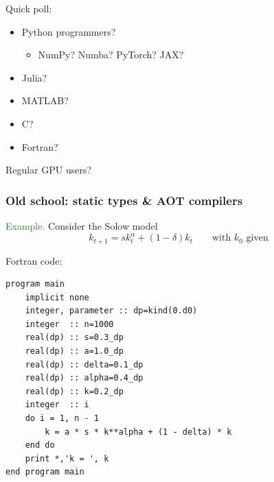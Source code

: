 \documentclass[
    xcolor={svgnames,dvipsnames},
    hyperref={colorlinks, citecolor=DeepPink4, linkcolor=DarkRed, urlcolor=DarkBlue}
    ]{beamer}  %
\newcommand{\Eg}{\textcolor{ForestGreen}{Example. }}
\newcommand{\1}{\mathbbm 1}
\begin{document}
\begin{frame}
    
    Quick poll:

    \begin{itemize}
        \item Python programmers?
    \vspace{0.5em}
            \begin{itemize}
                \item NumPy?  Numba?  PyTorch? JAX?
            \end{itemize}
    \vspace{0.5em}
        \item Julia?
    \vspace{0.5em}
        \item MATLAB?
    \vspace{0.5em}
        \item C?
    \vspace{0.5em}
        \item Fortran?
    \end{itemize}


    \vspace{0.5em}
    \vspace{0.5em}
    Regular GPU users?
    
\end{frame}



\begin{frame}
    \frametitle{Old school: static types \& AOT compilers}

    \Eg Consider the Solow model
    \begin{equation*}
        k_{t+1} = s k_t^\alpha + (1 - \delta) k_t
        \qquad \text{with } k_0 \text{ given}
    \end{equation*}


        \vspace{0.5em}
        \vspace{0.5em}
        \vspace{0.5em}

    Fortran code:


\end{frame}




\begin{frame}[fragile]
    
    \begin{verbatim}
program main
    implicit none
    integer, parameter :: dp=kind(0.d0)                          
    integer  :: n=1000
    real(dp) :: s=0.3_dp
    real(dp) :: a=1.0_dp
    real(dp) :: delta=0.1_dp
    real(dp) :: alpha=0.4_dp
    real(dp) :: k=0.2_dp
    integer  :: i
    do i = 1, n - 1                                                
        k = a * s * k**alpha + (1 - delta) * k
    end do
    print *,'k = ', k
end program main
    \end{verbatim}

\end{frame}
\end{document}
